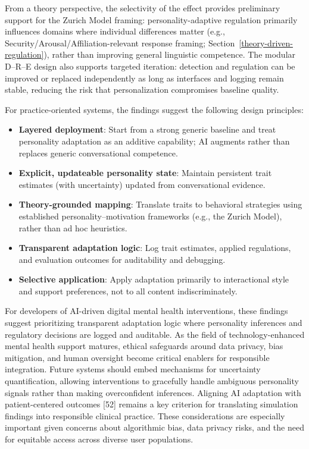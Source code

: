 From a theory perspective, the selectivity of the effect provides preliminary support for the Zurich Model framing: personality-adaptive regulation primarily influences domains where individual differences matter (e.g., Security/Arousal/Affiliation-relevant response framing; Section~\ref{theory-driven-regulation}), rather than improving general linguistic competence. The modular D--R--E design also supports targeted iteration: detection and regulation can be improved or replaced independently as long as interfaces and logging remain stable, reducing the risk that personalization compromises baseline quality.

For practice-oriented systems, the findings suggest the following design principles:

\begin{itemize}
\tightlist
\item
  \textbf{Layered deployment}: Start from a strong generic baseline and treat personality adaptation as an additive capability; AI augments rather than replaces generic conversational competence.
\item
  \textbf{Explicit, updateable personality state}: Maintain persistent trait estimates (with uncertainty) updated from conversational evidence.
\item
  \textbf{Theory-grounded mapping}: Translate traits to behavioral strategies using established personality--motivation frameworks (e.g., the Zurich Model), rather than ad hoc heuristics.
\item
  \textbf{Transparent adaptation logic}: Log trait estimates, applied regulations, and evaluation outcomes for auditability and debugging.
\item
  \textbf{Selective application}: Apply adaptation primarily to interactional style and support preferences, not to all content indiscriminately.
\end{itemize}

For developers of AI-driven digital mental health interventions, these findings suggest prioritizing transparent adaptation logic where personality inferences and regulatory decisions are logged and auditable. As the field of technology-enhanced mental health support matures, ethical safeguards around data privacy, bias mitigation, and human oversight become critical enablers for responsible integration. Future systems should embed mechanisms for uncertainty quantification, allowing interventions to gracefully handle ambiguous personality signals rather than making overconfident inferences. Aligning AI adaptation with patient-centered outcomes {[}52{]} remains a key criterion for translating simulation findings into responsible clinical practice. These considerations are especially important given concerns about algorithmic bias, data privacy risks, and the need for equitable access across diverse user populations.


